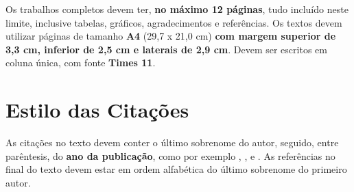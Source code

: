 \documentclass[11pt]{article}
\begin{document}
Os trabalhos completos devem ter, \textbf{no máximo 12 páginas}, tudo incluído neste limite, inclusive tabelas, gráficos, agradecimentos e referências.
Os textos devem utilizar páginas de tamanho \textbf{A4} (29,7 x 21,0 cm) \textbf{com margem superior de 3,3 cm, inferior de 2,5 cm e laterais de 2,9 cm}. Devem ser escritos em coluna única, com fonte \textbf{Times 11}.

\section{Estilo das Citações}

As citações no texto devem conter o último sobrenome do autor, seguido, entre parêntesis, do \textbf{ano da publicação}, como por exemplo \cite{knuth:84}, \cite{boulic:91}, e \cite{smith:99}. As referências no final do texto devem estar em ordem alfabética do último sobrenome do primeiro autor.



\end{document}
